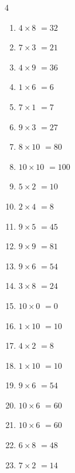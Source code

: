 \begin{multicols}{4}
\begin{enumerate}
  \item $4\times 8$
        $=32$

  \item $7\times 3$
        $=21$

  \item $4\times 9$
        $=36$

\columnbreak %

  \item $1\times 6$
        $=6$

  \item $7\times 1$
        $=7$

  \item $9\times 3$
        $=27$

  \item $8\times 10$
        $=80$

  \item $10\times 10$
        $=100$

  \item $5\times 2$
        $=10$

  \item $2\times 4$
        $=8$

  \item $9\times 5$
        $=45$

  \item $9\times 9$
        $=81$

  \item $9\times 6$
        $=54$

  \item $3\times 8$
        $=24$

  \item $10\times 0$
        $=0$

  \item $1\times 10$
        $=10$

  \item $4\times 2$
        $=8$

  \item $1\times 10$
        $=10$

  \item $9\times 6$
        $=54$

  \item $10\times 6$
        $=60$

  \item $10\times 6$
        $=60$

  \item $6\times 8$
        $=48$

  \item $7\times 2$
        $=14$


\end{enumerate}
\end{multicols}

